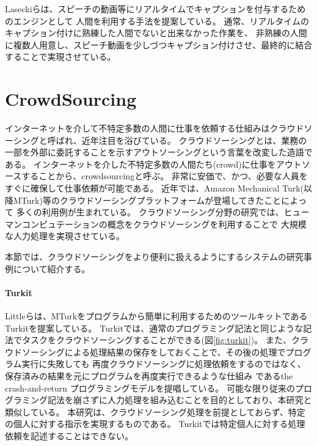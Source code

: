 \mbox{}

Laseckiら\cite{realtime-captioning}は、スピーチの動画等にリアルタイムでキャプションを付与するためのエンジンとして
人間を利用する手法を提案している。
通常、リアルタイムのキャプション付けに熟練した人間でないと出来なかった作業を、
非熟練の人間に複数人用意し、スピーチ動画を少しづつキャプション付けさせ、最終的に結合することで実現させている。

\section{CrowdSourcing}\label{crowdsourcing}

インターネットを介して不特定多数の人間に仕事を依頼する仕組みはクラウドソーシングと呼ばれ、近年注目を浴びている。
クラウドソーシングとは、業務の一部を外部に委託することを示すアウトソーシングという言葉を改変した造語である\cite{riseofcrowdsourcing}。
インターネットを介した不特定多数の人間たち(crowd)に仕事をアウトソースすることから、crowdsourcingと呼ぶ。
非常に安価で、かつ、必要な人員をすぐに確保して仕事依頼が可能である。
近年では、Amazon Mechanical
Turk\cite{amt}(以降MTurk)等のクラウドソーシングプラットフォームが登場してきたことによって
多くの利用例が生まれている。
クラウドソーシング分野の研究では、ヒューマンコンピュテーションの概念をクラウドソーシングを利用することで
大規模な人力処理を実現させている。

本節では、クラウドソーシングをより便利に扱えるようにするシステムの研究事例について紹介する。

\paragraph{Turkit}\label{turkit}

\mbox{}

Littleらは、MTurkをプログラムから簡単に利用するためのツールキットであるTurkit\cite{turkit}を提案している。
Turkitでは、通常のプログラミング記法と同じような記法でタスクをクラウドソーシングすることができる(図\ref{fig:turkit})。
また、クラウドソーシングによる処理結果の保存をしておくことで、その後の処理でプログラム実行に失敗しても
再度クラウドソーシングに処理依頼をするのではなく、保存済みの結果を元にプログラムを再度実行できるような仕組み
であるthe crash-and-return プログラミングモデルを提唱している。
可能な限り従来のプログラミング記法を崩さずに人力処理を組み込むことを目的としており、本研究と類似している。
本研究は、クラウドソーシング処理を前提としておらず、特定の個人に対する指示を実現するものである。
Turkitでは特定個人に対する処理依頼を記述することはできない。

